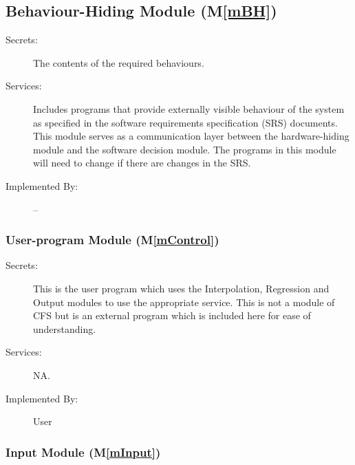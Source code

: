 \documentclass[12pt, titlepage]{article}
\newcommand{\mref}[1]{M\ref{#1}}
\newcommand{\famname}{CFS} %
\begin{document}
\subsection{Behaviour-Hiding Module (\mref{mBH})}

\begin{description}
\item[Secrets:]The contents of the required behaviours.
\item[Services:]Includes programs that provide externally visible behaviour of
  the system as specified in the software requirements specification (SRS)
  documents. This module serves as a communication layer between the
  hardware-hiding module and the software decision module. The programs in this
  module will need to change if there are changes in the SRS.
\item[Implemented By:] --
\end{description}
\subsubsection{User-program Module (\mref{mControl})}

\begin{description}
\item[Secrets:]This is the user program which
  uses the Interpolation, Regression and Output modules to use the appropriate 
  service. This is not a module of \famname{} but is an external program which 
  is included here for ease of understanding.
	\item[Services:] NA.
	\item[Implemented By:] User
\end{description}

\subsubsection{Input Module (\mref{mInput})}
\end{document}
